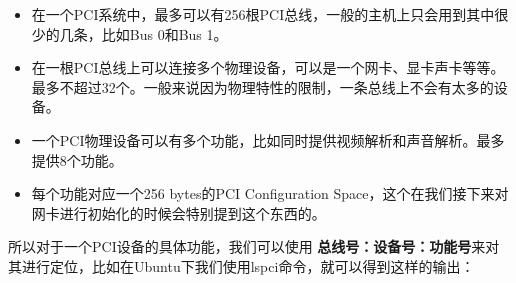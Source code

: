 \documentclass{article}
\begin{document}
\begin{CJK*}{UTF8}{gkai}
\begin{description}
\begin{itemize}
\item{在一个PCI系统中，最多可以有256根PCI总线，一般的主机上只会用到其中很少的几条，比如Bus 0和Bus 1。}
\item{在一根PCI总线上可以连接多个物理设备，可以是一个网卡、显卡声卡等等。最多不超过32个。一般来说因为物理特性的限制，一条总线上不会有太多的设备。}
\item{一个PCI物理设备可以有多个功能，比如同时提供视频解析和声音解析。最多提供8个功能。}
\item{每个功能对应一个256 bytes的PCI Configuration Space，这个在我们接下来对网卡进行初始化的时候会特别提到这个东西的。}
\end{itemize}


所以对于一个PCI设备的具体功能，我们可以使用 {\bfseries 总线号：设备号：功能号}来对其进行定位，比如在Ubuntu下我们使用lspci命令，就可以得到这样的输出：


\end{description}
\end{CJK*}
\end{document}
